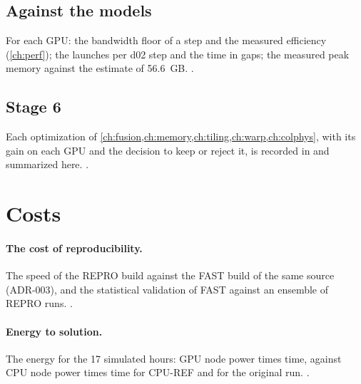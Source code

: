 \subsection{Against the models}

For each GPU: the bandwidth floor of a step and the measured efficiency (\cref{ch:perf}); the launches per d02 step
and the time in gaps; the measured peak memory against the estimate of 56.6~GB. \tbr.

\subsection{Stage 6}

Each optimization of \cref{ch:fusion,ch:memory,ch:tiling,ch:warp,ch:colphys}, with its gain on each GPU and the
decision to keep or reject it, is recorded in  and summarized here. \tbr.

\section{Costs}

\paragraph{The cost of reproducibility.} The speed of the REPRO build against the FAST build of the same source
(ADR-003), and the statistical validation of FAST against an ensemble of REPRO runs. \tbr.

\paragraph{Energy to solution.} The energy for the 17 simulated hours: GPU node power times time, against CPU node power
times time for CPU-REF and for the original run. \tbr.
